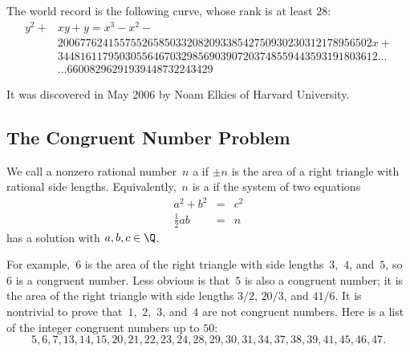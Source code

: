 The world record 
is the following curve, whose rank is at least $28$:
\begin{align*}
y^2 + &xy + y = x^3 - x^2 - \\
   & 20067762415575526585033208209338542750930230312178956502x + \\
   & 344816117950305564670329856903907203748559443593191803612\ldots\\
   & \ldots 66008296291939448732243429
\end{align*}

It was discovered in May 2006 by Noam Elkies of Harvard
University.


\subsection{The Congruent Number Problem}\label{sec:congnumprob}
\begin{definition}
We call a nonzero rational number~$n$ a  if
$\pm n$ is the area of a right triangle with rational
side lengths.  Equivalently,~$n$ is a  if the
system of two equations
\begin{eqnarray*}
a^2+b^2&=&c^2\\
\frac{1}{2}ab&=&n
\end{eqnarray*}
has a solution with $a,b,c\in\Q$.
\end{definition}
For example,~$6$ is the area of the right triangle with side lengths~$3$,~$4$,
and~$5$, so~$6$ is a congruent number.
Less obvious is that~$5$
is also a congruent number; it is the area of the right triangle
with side lengths $3/2$, $20/3$,  and $41/6$.  It is nontrivial
to prove that~$1$,~$2$,~$3$, and~$4$ are not congruent numbers.
Here is a list of the integer
congruent numbers
up to $50$:
{
$$
5, 6, 7, 13, 14, 15, 20, 21, 22, 23, 24, 28, 29, 30, 31, 34, 37, 38, 39, 41, 45, 46, 47.
$$
}

